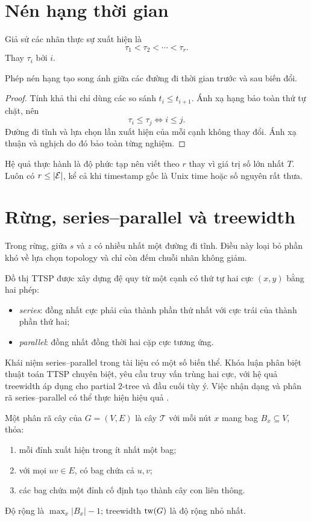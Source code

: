 \section{Nén hạng thời gian}

Giả sử các nhãn thực sự xuất hiện là
\[
  \tau_1<\tau_2<\cdots<\tau_r.
\]
Thay $\tau_i$ bởi $i$.

\begin{lemma}
Phép nén hạng tạo song ánh giữa các đường đi thời gian trước và sau biến đổi.
\end{lemma}

\begin{proof}
Tính khả thi chỉ dùng các so sánh $t_i\le t_{i+1}$. Ánh xạ hạng bảo toàn thứ tự chặt, nên
\[
  \tau_i\le\tau_j \iff i\le j.
\]
Đường đi tĩnh và lựa chọn lần xuất hiện của mỗi cạnh không thay đổi. Ánh xạ thuận và nghịch do đó bảo toàn từng nghiệm.
\end{proof}

Hệ quả thực hành là độ phức tạp nên viết theo $r$ thay vì giá trị số lớn nhất $T$. Luôn có $r\le|\mathcal{E}|$, kể cả khi timestamp gốc là Unix time hoặc số nguyên rất thưa.

\section{Rừng, series--parallel và treewidth}

Trong rừng, giữa $s$ và $z$ có nhiều nhất một đường đi tĩnh. Điều này loại bỏ phần khó về lựa chọn topology và chỉ còn đếm chuỗi nhãn không giảm.

Đồ thị TTSP được xây dựng đệ quy từ một cạnh có thứ tự hai cực $(x,y)$ bằng hai phép:
\begin{itemize}
  \item \emph{series}: đồng nhất cực phải của thành phần thứ nhất với cực trái của thành phần thứ hai;
  \item \emph{parallel}: đồng nhất đồng thời hai cặp cực tương ứng.
\end{itemize}
Khái niệm series--parallel trong tài liệu có một số biến thể. Khóa luận phân biệt thuật toán TTSP chuyên biệt, yêu cầu truy vấn trùng hai cực, với hệ quả treewidth áp dụng cho partial $2$-tree và đầu cuối tùy ý. Việc nhận dạng và phân rã series--parallel có thể thực hiện hiệu quả \cite{eppstein1992}.

\begin{definition}
Một phân rã cây của $G=(V,E)$ là cây $\mathcal{T}$ với mỗi nút $x$ mang bag $B_x\subseteq V$, thỏa:
\begin{enumerate}
  \item mỗi đỉnh xuất hiện trong ít nhất một bag;
  \item với mọi $uv\in E$, có bag chứa cả $u,v$;
  \item các bag chứa một đỉnh cố định tạo thành cây con liên thông.
\end{enumerate}
Độ rộng là $\max_x|B_x|-1$; treewidth $\operatorname{tw}(G)$ là độ rộng nhỏ nhất.
\end{definition}

